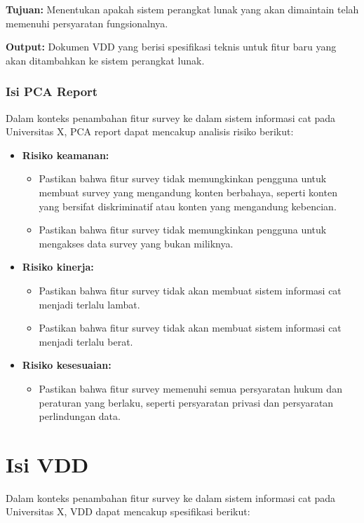 \documentclass[12pt]{article}
\begin{document}
\textbf{Tujuan:} Menentukan apakah sistem perangkat lunak yang akan dimaintain telah memenuhi persyaratan fungsionalnya.

\textbf{Output:} Dokumen VDD yang berisi spesifikasi teknis untuk fitur baru yang akan ditambahkan ke sistem perangkat lunak.

\subsubsection*{Isi PCA Report}

Dalam konteks penambahan fitur survey ke dalam sistem informasi cat pada Universitas X, PCA report dapat mencakup analisis risiko berikut:

\begin{itemize}
    \item \textbf{Risiko keamanan:}
    \begin{itemize}
        \item Pastikan bahwa fitur survey tidak memungkinkan pengguna untuk membuat survey yang mengandung konten berbahaya, seperti konten yang bersifat diskriminatif atau konten yang mengandung kebencian.
        \item Pastikan bahwa fitur survey tidak memungkinkan pengguna untuk mengakses data survey yang bukan miliknya.
    \end{itemize}
    \item \textbf{Risiko kinerja:}
    \begin{itemize}
        \item Pastikan bahwa fitur survey tidak akan membuat sistem informasi cat menjadi terlalu lambat.
        \item Pastikan bahwa fitur survey tidak akan membuat sistem informasi cat menjadi terlalu berat.
    \end{itemize}
    \item \textbf{Risiko kesesuaian:}
    \begin{itemize}
        \item Pastikan bahwa fitur survey memenuhi semua persyaratan hukum dan peraturan yang berlaku, seperti persyaratan privasi dan persyaratan perlindungan data.
    \end{itemize}
\end{itemize}

\section*{Isi VDD}

Dalam konteks penambahan fitur survey ke dalam sistem informasi cat pada Universitas X, VDD dapat mencakup spesifikasi berikut:
\end{document}
